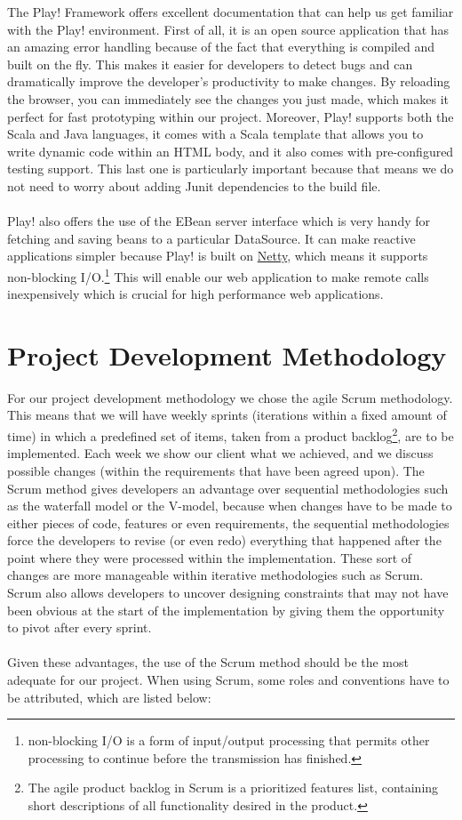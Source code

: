  
The Play! Framework offers excellent documentation\cite{playDoc} that can help us get familiar with the Play! environment. First of all, it is an open source application that has an amazing error handling because of the fact that everything is compiled and built on the fly. This makes it easier for developers to detect bugs and can dramatically improve the developer's productivity to make changes. By reloading the browser, you can immediately see the changes you just made, which makes it perfect for fast prototyping within our project. Moreover, Play! supports both the Scala and Java languages, it comes with a Scala template that allows you to write dynamic code within an HTML body, and it also comes with pre-configured testing support. This last one is particularly important because that means we do not need to worry about adding Junit dependencies to the build file. \\\\
Play! also offers the use of the EBean server interface which is very handy for fetching and saving beans to a particular DataSource. It can make reactive applications simpler because Play! is built on \href{http://netty.io/}{Netty}, which means it supports non-blocking I/O.\footnote{ non-blocking I/O is a form of input/output processing that permits other processing to continue before the transmission has finished.} This will enable our web application to make remote calls inexpensively which is crucial for high performance web applications.

\section{Project Development Methodology} %

For our project development methodology we chose the agile Scrum methodology. This means that we will have weekly sprints (iterations within a fixed amount of time) in which a predefined set of items, taken from a product backlog\footnote{The agile product backlog in Scrum is a prioritized features list, containing short descriptions of all functionality desired in the product.\cite{backlog} }, are to be implemented. Each week we show our client what we achieved, and we discuss possible changes (within the requirements that have been agreed upon). The Scrum method gives developers an advantage over sequential methodologies such as the waterfall model or the V-model, because when changes have to be made to either pieces of code, features or even requirements, the sequential methodologies force the developers to revise (or even redo) everything that happened after the point where they were processed within the implementation. These sort of changes are more manageable within iterative methodologies such as Scrum. Scrum also allows developers to uncover designing constraints that may not have been obvious at the start of the implementation by giving them the opportunity to pivot after every sprint. \\\\
Given these advantages, the use of the Scrum method should be the most adequate for our project. When using Scrum, some roles and conventions have to be attributed, which are listed below:

